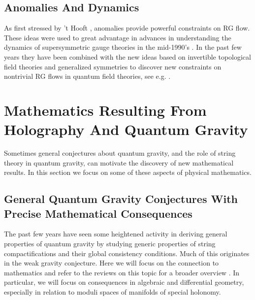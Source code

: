 \documentclass[12pt]{article}
\newcommand{\comments}[1]{{\color{magenta}  #1}}
\begin{document}
\subsection{Anomalies And Dynamics}
\label{sec:tHooftAnomalies}


As first stressed by 't Hooft \cite{tHooft:1979rat}, anomalies
provide powerful constraints on RG flow. These ideas were
used to great advantage in advances in understanding the
dynamics of supersymmetric gauge theories in the mid-1990's
\cite{Intriligator:2007cp}. In the past few years they have
been combined with the new ideas based on invertible
topological field theories and generalized symmetries
to discover new constraints on nontrivial RG flows in
quantum field theories, see e.g. \cite{Gaiotto:2017yup,Gaiotto:2017tne,Cordova:2019uob,Cordova:2019jnf,Cordova:2019jqi,Cordova:2019bsd, Bhardwaj:2022dyt, Delmastro:2022pfo, Brennan:2022tyl}.














\section{Mathematics Resulting From  Holography And Quantum Gravity}
\label{sec:HoloQG}

Sometimes general conjectures about quantum gravity, and the role 
of string theory in quantum gravity, can motivate the discovery 
of new mathematical results. In this section we focus on some of these 
aspects of physical mathematics. 


\subsection{General Quantum Gravity Conjectures With Precise Mathematical Consequences}


The past few years have seen some heightened activity in deriving general properties of quantum gravity by studying generic properties of  string compactifications and their global consistency conditions. Much of this originates in the weak gravity conjecture. 
Here we will focus on the connection to mathematics and refer to the reviews on this topic for a broader overview 
\cite{Taylor:2011wt, Brennan:2017rbf, Palti:2019pca, vanBeest:2021lhn, Harlow:2022gzl}.  
In particular,  we will focus on consequences in algebraic and differential geometry, 
especially in relation to moduli spaces of manifolds of special holonomy.
\end{document}
